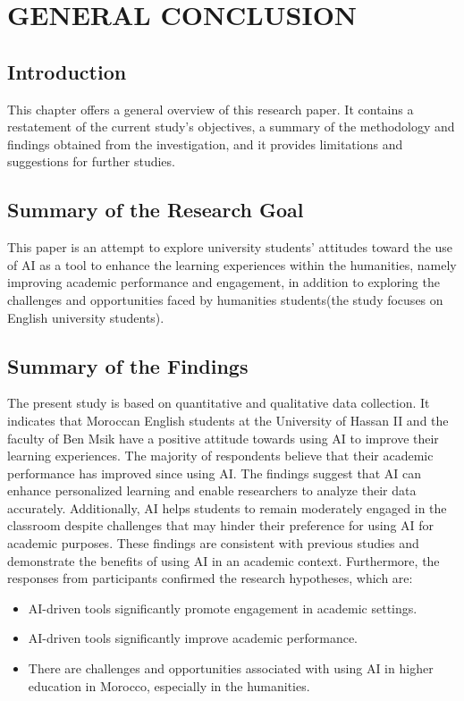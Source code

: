 \chapter{GENERAL CONCLUSION}
\section{Introduction}

This chapter offers a general overview of this research paper.
It contains a restatement of the current study’s objectives, a summary
of the methodology and findings obtained from the investigation, and 
it provides limitations and suggestions for further studies.

\section{Summary of the Research Goal}

This paper is an attempt to explore university students’ attitudes toward the 
use of AI as a tool to enhance the learning experiences within the humanities, 
namely improving academic performance and engagement, in addition to exploring the
challenges and opportunities faced by humanities students(the study focuses on English university students).

\section{Summary of the Findings}


The present study is based on quantitative and qualitative data collection. 
It indicates that Moroccan English students at the University of Hassan II and the faculty of Ben Msik have
a positive attitude towards using AI to improve their learning experiences. 
The majority of respondents believe that their academic performance has improved since using AI.
The findings suggest that AI can enhance personalized learning and enable researchers to analyze their data accurately. 
Additionally, AI helps students to remain moderately engaged in the classroom
despite challenges that may hinder their preference for using AI for academic purposes. 
These findings are consistent with previous studies and demonstrate the benefits of using AI in an academic context. 
Furthermore, the responses from participants confirmed the research hypotheses, which are:
\begin{itemize}
	
\item AI-driven tools significantly promote engagement in academic settings.
\item AI-driven tools significantly improve academic performance.
\item There are challenges and opportunities associated with using AI in higher education in Morocco, especially in the humanities.
\end{itemize}
